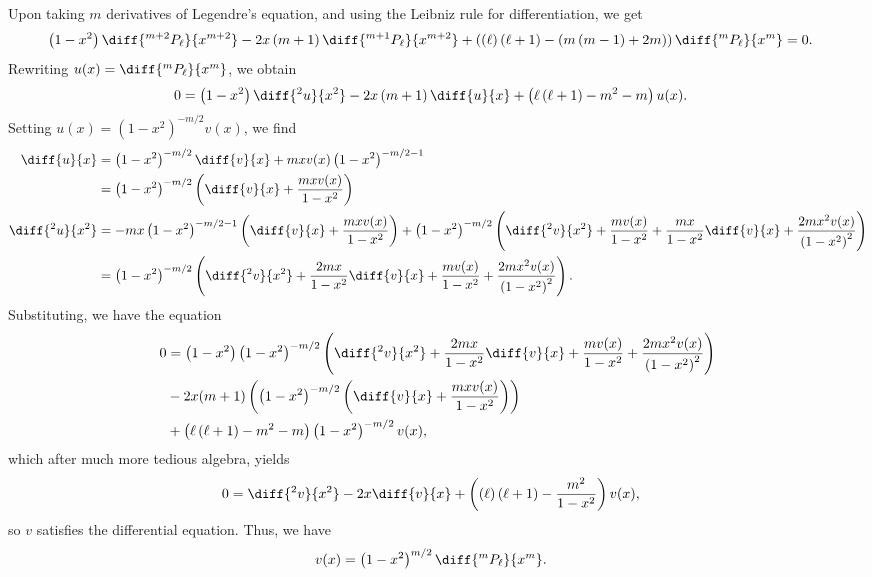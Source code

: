 \documentclass[10pt]{mypackage}
\begin{document}
\begin{solution}[32.23]
  Upon taking $m$ derivatives of Legendre's equation, and using the Leibniz rule for differentiation, we get
  \begin{align*}
    \left( 1-x^2 \right)\diff{^{m+2}P_{\ell}}{x^{m+2}} - 2x\left( m+1 \right)\diff{^{m+1}P_{\ell}}{x^{m+2}} + \left( \left( \ell \right)\left( \ell + 1 \right) - \left( m\left( m-1 \right) + 2m \right) \right)\diff{^{m}P_{\ell}}{x^{m}} &= 0.
  \end{align*}
  Rewriting $u(x) = \diff{^mP_{\ell}}{x^{m}}$, we obtain
  \begin{align*}
    0 &= \left( 1-x^2 \right)\diff{^2u}{x^2} -2x\left( m+1 \right)\diff{u}{x} + \left( \ell\left( \ell + 1 \right)-m^2-m \right)u(x).
  \end{align*}
  Setting $u(x) = \left( 1-x^2 \right)^{-m/2} v(x)$, we find
  \begin{align*}
    \diff{u}{x} &= \left( 1-x^2 \right)^{-m/2}\diff{v}{x} + mxv(x)\left( 1-x^2 \right)^{-m/2 - 1}\\
                &= \left( 1-x^2 \right)^{-m/2}\left( \diff{v}{x} + \frac{mxv(x)}{1-x^2} \right)\\
    \diff{^2u}{x^2} &= -mx\left( 1-x^2 \right)^{-m/2-1}\left( \diff{v}{x} + \frac{mxv(x)}{1-x^2} \right) + \left( 1-x^2 \right)^{-m/2}\left( \diff{^2v}{x^2} + \frac{mv(x)}{1-x^2} + \frac{mx}{1-x^2}\diff{v}{x} + \frac{2mx^2v(x)}{\left( 1-x^2 \right)^2} \right)\\
                    &= \left( 1-x^2 \right)^{-m/2}\left( \diff{^2v}{x^2} + \frac{2mx}{1-x^2}\diff{v}{x} + \frac{mv(x)}{1-x^2} + \frac{2mx^2v(x)}{\left( 1-x^2 \right)^2} \right).
  \end{align*}
  Substituting, we have the equation
  \begin{align*}
    0 &= \left( 1-x^2 \right)\left( 1-x^2 \right)^{-m/2}\left( \diff{^2v}{x^2} + \frac{2mx}{1-x^2}\diff{v}{x} + \frac{mv(x)}{1-x^2} + \frac{2mx^2v(x)}{\left( 1-x^2 \right)^2} \right)\\
      &- 2x(m+1) \left( \left( 1-x^2 \right)^{-m/2}\left( \diff{v}{x} + \frac{mxv(x)}{1-x^2} \right) \right)\\
      &+\left( \ell\left( \ell + 1 \right)-m^2-m \right)\left( 1-x^2 \right)^{-m/2}v(x),
  \end{align*}
  which after much more tedious algebra, yields
  \begin{align*}
    0 &= \diff{^2v}{x^2} - 2x \diff{v}{x} + \left( \left( \ell \right)\left( \ell + 1 \right) - \frac{m^2}{1-x^2} \right)v(x),
  \end{align*}
  so $v$ satisfies the differential equation. Thus, we have
  \begin{align*}
    v(x) &= \left( 1-x^2 \right)^{m/2}\diff{^{m}P_{\ell}}{x^{m}}.
  \end{align*}
  
\end{solution}
\end{document}
